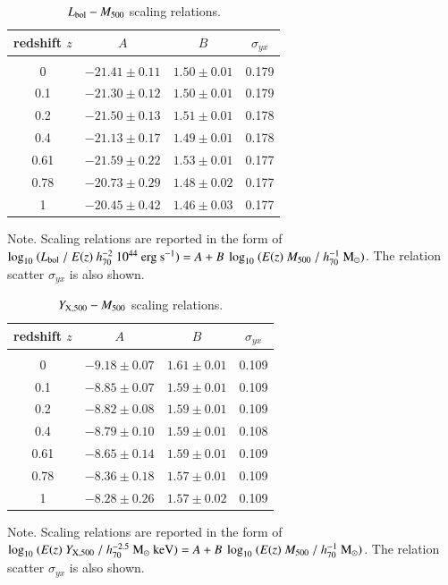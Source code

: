 \documentclass[useAMS,usenatbib]{mn2e}
\begin{document}
\begin{table} 
\begin{center}
\caption{$L_{{\mathrm{bol}}}-M_{500}$ scaling relations.}
\medskip
\begin{tabular}{cccc}
\hline
\phantom{\Big|}
redshift $z$ & $A$ & $B$ & $\sigma_{yx}$ \\
\hline \\[-0.5em]
 0      & $-21.41\pm0.11$ & $1.50\pm0.01$ & 0.179\\
 0.1   & $-21.30\pm0.12$ & $1.50\pm0.01$ & 0.179\\
 0.2   & $-21.50\pm0.13$ & $1.51\pm0.01$ & 0.178\\ 
 0.4   & $-21.13\pm0.17$ & $1.49\pm0.01$ & 0.178\\ 
 0.61 & $-21.59\pm0.22$ & $1.53\pm0.01$ & 0.177\\ 
 0.78 & $-20.73\pm0.29$ & $1.48\pm0.02$ & 0.177\\ 
 1      & $-20.45\pm0.42$ & $1.46\pm0.03$ & 0.177\\[0.5em]
\hline
\end{tabular}
\label{tab:LMfits}
\end{center}
\footnotesize{Note. Scaling relations are reported in the form of $\log_{10}~(L_{{\mathrm{bol}}}~/~E(z)~h_{70}^{-2}~10^{44}~{\mathrm{erg~s}}^{-1})=A+B~\log_{10}~(E(z)~M_{500}~/~h_{70}^{-1}~{\mathrm{M_{\odot}}})$. The relation scatter $\sigma_{yx}$ is also shown.}
\end{table}
 
\begin{table} 
\begin{center}
\caption{$Y_{{\mathrm{X}}, 500}-M_{500}$ scaling relations.}
\medskip
\begin{tabular}{cccc}
\hline
\phantom{\Big|}
redshift $z$ & $A$ & $B$ & $\sigma_{yx}$ \\
\hline\\[-0.5em]
 0      & $-9.18\pm0.07$ & $1.61\pm0.01$ & 0.109\\
 0.1   & $-8.85\pm0.07$ & $1.59\pm0.01$ & 0.109\\
 0.2   & $-8.82\pm0.08$ & $1.59\pm0.01$ & 0.109\\ 
 0.4   & $-8.79\pm0.10$ & $1.59\pm0.01$ & 0.108\\ 
 0.61 & $-8.65\pm0.14$ & $1.59\pm0.01$ & 0.109\\ 
 0.78 & $-8.36\pm0.18$ & $1.57\pm0.01$ & 0.109\\ 
 1      & $-8.28\pm0.26$ & $1.57\pm0.02$ & 0.109\\[0.5em]  
\hline
\end{tabular}
\label{tab:YXfits}
\end{center}
\footnotesize{Note. Scaling relations are reported in the form of $\log_{10}~(E(z)~Y_{{\mathrm{X}},500}~/~h_{70}^{-2.5}~{\mathrm{M_{\odot}}}~{\mathrm{keV}})=A+B~\log_{10}~(E(z)~M_{500}~/~h_{70}^{-1}~{\mathrm{M_{\odot}}})$. The relation scatter $\sigma_{yx}$ is also shown.}
\end{table}
\end{document}
